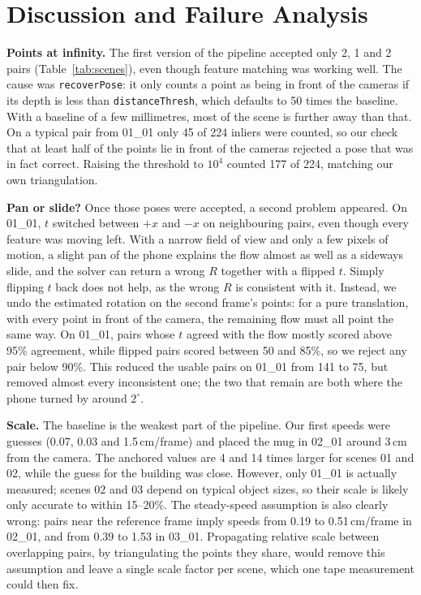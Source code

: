 \documentclass[conference]{assets/latex/IEEEtran}
\begin{document}
\section{Discussion and Failure Analysis}\label{sec:discussion}

\textbf{Points at infinity.} The first version of the pipeline accepted only 2, 1 and 2 pairs (Table~\ref{tab:scenes}), even though feature matching was working well. The cause was \texttt{recoverPose}: it only counts a point as being in front of the cameras if its depth is less than \texttt{distanceThresh}, which defaults to 50 times the baseline. With a baseline of a few millimetres, most of the scene is further away than that. On a typical pair from 01\_01 only 45 of 224 inliers were counted, so our check that at least half of the points lie in front of the cameras rejected a pose that was in fact correct. Raising the threshold to $10^4$ counted 177 of 224, matching our own triangulation.

\textbf{Pan or slide?} Once those poses were accepted, a second problem appeared. On 01\_01, $t$ switched between $+x$ and $-x$ on neighbouring pairs, even though every feature was moving left. With a narrow field of view and only a few pixels of motion, a slight pan of the phone explains the flow almost as well as a sideways slide, and the solver can return a wrong $R$ together with a flipped $t$. Simply flipping $t$ back does not help, as the wrong $R$ is consistent with it. Instead, we undo the estimated rotation on the second frame's points: for a pure translation, with every point in front of the camera, the remaining flow must all point the same way. On 01\_01, pairs whose $t$ agreed with the flow mostly scored above 95\% agreement, while flipped pairs scored between 50 and 85\%, so we reject any pair below 90\%. This reduced the usable pairs on 01\_01 from 141 to 75, but removed almost every inconsistent one; the two that remain are both where the phone turned by around $2^\circ$.

\textbf{Scale.} The baseline is the weakest part of the pipeline. Our first speeds were guesses (0.07, 0.03 and 1.5\,cm/frame) and placed the mug in 02\_01 around 3\,cm from the camera. The anchored values are 4 and 14 times larger for scenes 01 and 02, while the guess for the building was close. However, only 01\_01 is actually measured; scenes 02 and 03 depend on typical object sizes, so their scale is likely only accurate to within 15--20\%. The steady-speed assumption is also clearly wrong: pairs near the reference frame imply speeds from 0.19 to 0.51\,cm/frame in 02\_01, and from 0.39 to 1.53 in 03\_01. Propagating relative scale between overlapping pairs, by triangulating the points they share, would remove this assumption and leave a single scale factor per scene, which one tape measurement could then fix.
\end{document}

